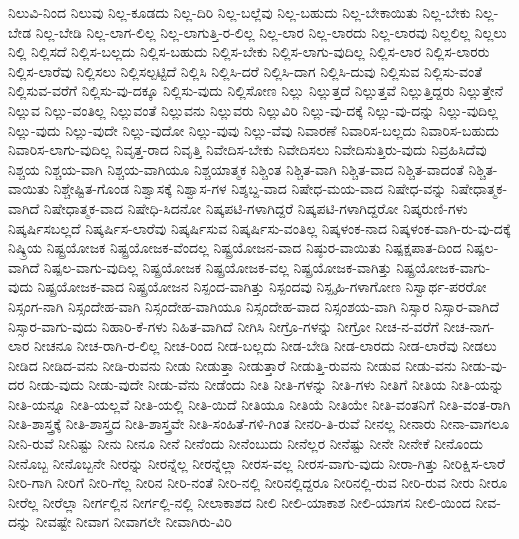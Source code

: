 {ನಿಲುವಿ-ನಿಂದ
ನಿಲುವು
ನಿಲ್ಲ-ಕೂಡದು
ನಿಲ್ಲ-ದಿರಿ
ನಿಲ್ಲ-ಬಲ್ಲೆವು
ನಿಲ್ಲ-ಬಹುದು
ನಿಲ್ಲ-ಬೇಕಾಯಿತು
ನಿಲ್ಲ-ಬೇಕು
ನಿಲ್ಲ-ಬೇಡ
ನಿಲ್ಲ-ಬೇಡಿ
ನಿಲ್ಲ-ಲಾಗ-ಲಿಲ್ಲ
ನಿಲ್ಲ-ಲಾಗುತ್ತಿ-ರ-ಲಿಲ್ಲ
ನಿಲ್ಲ-ಲಾರ
ನಿಲ್ಲ-ಲಾರದು
ನಿಲ್ಲ-ಲಾರವು
ನಿಲ್ಲಲಿಲ್ಲ
ನಿಲ್ಲಲು
ನಿಲ್ಲಿ
ನಿಲ್ಲಿಸದೆ
ನಿಲ್ಲಿಸ-ಬಲ್ಲದು
ನಿಲ್ಲಿಸ-ಬಹುದು
ನಿಲ್ಲಿಸ-ಬೇಕು
ನಿಲ್ಲಿಸ-ಲಾಗು-ವುದಿಲ್ಲ
ನಿಲ್ಲಿಸ-ಲಾರ
ನಿಲ್ಲಿಸ-ಲಾರರು
ನಿಲ್ಲಿಸ-ಲಾರೆವು
ನಿಲ್ಲಿಸಲು
ನಿಲ್ಲಿಸಲ್ಪಟ್ಟಿದೆ
ನಿಲ್ಲಿಸಿ
ನಿಲ್ಲಿಸಿ-ದರೆ
ನಿಲ್ಲಿಸಿ-ದಾಗ
ನಿಲ್ಲಿಸಿ-ದುವು
ನಿಲ್ಲಿಸುವ
ನಿಲ್ಲಿಸು-ವಂತೆ
ನಿಲ್ಲಿಸುವ-ವರೆಗೆ
ನಿಲ್ಲಿಸು-ವು-ದಕ್ಕೂ
ನಿಲ್ಲಿಸು-ವುದು
ನಿಲ್ಲಿಸೋಣ
ನಿಲ್ಲು
ನಿಲ್ಲುತ್ತದೆ
ನಿಲ್ಲುತ್ತವೆ
ನಿಲ್ಲುತ್ತಿದ್ದರು
ನಿಲ್ಲುತ್ತೇನೆ
ನಿಲ್ಲುವ
ನಿಲ್ಲು-ವಂತಿಲ್ಲ
ನಿಲ್ಲುವಂತೆ
ನಿಲ್ಲುವನು
ನಿಲ್ಲುವರು
ನಿಲ್ಲುವಿರಿ
ನಿಲ್ಲು-ವು-ದಕ್ಕೆ
ನಿಲ್ಲು-ವು-ದನ್ನು
ನಿಲ್ಲು-ವುದಿಲ್ಲ
ನಿಲ್ಲು-ವುದು
ನಿಲ್ಲು-ವುದೇ
ನಿಲ್ಲು-ವುದೋ
ನಿಲ್ಲು-ವುವು
ನಿಲ್ಲು-ವೆವು
ನಿವಾರಣೆ
ನಿವಾರಿಸ-ಬಲ್ಲದು
ನಿವಾರಿಸ-ಬಹುದು
ನಿವಾರಿಸ-ಲಾಗು-ವುದಿಲ್ಲ
ನಿವೃತ್ತ-ರಾದ
ನಿವೃತ್ತಿ
ನಿವೇದಿಸ-ಬೇಕು
ನಿವೇದಿಸಲು
ನಿವೇದಿಸುತ್ತಿರು-ವುದು
ನಿವ್ರಹಿಸಿದೆವು
ನಿಶ್ಚಯ
ನಿಶ್ಚಯ-ವಾಗಿ
ನಿಶ್ಚಯ-ವಾಗಿಯೂ
ನಿಶ್ಚಯಾತ್ಮಕ
ನಿಶ್ಚಿಂತ
ನಿಶ್ಚಿತ-ವಾಗಿ
ನಿಶ್ಚಿತ-ವಾದ
ನಿಶ್ಚಿತ-ವಾದಂತೆ
ನಿಶ್ಚಿತ-ವಾಯಿತು
ನಿಶ್ಚೇಷ್ಟಿತ-ಗೊಂಡ
ನಿಶ್ವಾಸಕ್ಕೆ
ನಿಶ್ವಾಸ-ಗಳ
ನಿಶ್ಶಬ್ದ-ವಾದ
ನಿಷೇಧ-ಮಯ-ವಾದ
ನಿಷೇಧ-ವನ್ನು
ನಿಷೇಧಾತ್ಮಕ-ವಾಗಿದೆ
ನಿಷೇಧಾತ್ಮಕ-ವಾದ
ನಿಷೇಧಿ-ಸಿದನೋ
ನಿಷ್ಕಪಟಿ-ಗಳಾಗಿದ್ದರೆ
ನಿಷ್ಕಪಟಿ-ಗಳಾಗಿದ್ದರೋ
ನಿಷ್ಕರುಣಿ-ಗಳು
ನಿಷ್ಕರ್ಷಿಸಬಲ್ಲದೆ
ನಿಷ್ಕರ್ಷಿಸ-ಲಾರೆವು
ನಿಷ್ಕರ್ಷಿಸುವ
ನಿಷ್ಕರ್ಷಿಸು-ವಂತಿಲ್ಲ
ನಿಷ್ಕಳಂಕ-ನಾದ
ನಿಷ್ಕಳಂಕ-ವಾಗಿ-ರು-ವು-ದಕ್ಕೆ
ನಿಷ್ಕ್ರಿಯ
ನಿಷ್ಟ್ರಯೋಜಕ
ನಿಷ್ಟ್ರಯೋಜಕ-ವೆಂದಲ್ಲ
ನಿಷ್ಟ್ರಯೋಜನ-ವಾದ
ನಿಷ್ಠುರ-ವಾಯಿತು
ನಿಷ್ಪಕ್ಷಪಾತ-ದಿಂದ
ನಿಷ್ಪಲ-ವಾಗಿದೆ
ನಿಷ್ಪಲ-ವಾಗು-ವುದಿಲ್ಲ
ನಿಷ್ಪ್ರಯೋಜಕ
ನಿಷ್ಪ್ರಯೋಜಕ-ವಲ್ಲ
ನಿಷ್ಪ್ರಯೋಜಕ-ವಾಗಿತ್ತು
ನಿಷ್ಪ್ರಯೋಜಕ-ವಾಗು-ವುದು
ನಿಷ್ಪ್ರಯೋಜಕ-ವಾದ
ನಿಷ್ಪ್ರಯೋಜನ
ನಿಸ್ಪಂದ-ವಾಗಿತ್ತು
ನಿಸ್ಪಂದವು
ನಿಸ್ಪೃಹಿ-ಗಳಾಗೋಣ
ನಿಸ್ವಾರ್ಥ-ಪರರೋ
ನಿಸ್ಸಂಗ-ನಾಗಿ
ನಿಸ್ಸಂದೇಹ-ವಾಗಿ
ನಿಸ್ಸಂದೇಹ-ವಾಗಿಯೂ
ನಿಸ್ಸಂದೇಹ-ವಾದ
ನಿಸ್ಸಂಶಯ-ವಾಗಿ
ನಿಸ್ಸಾರ
ನಿಸ್ಸಾರ-ವಾಗಿದೆ
ನಿಸ್ಸಾರ-ವಾಗು-ವುದು
ನಿಹಾರಿ-ಕೆ-ಗಳು
ನಿಹಿತ-ವಾಗಿದೆ
ನೀಗಿಸಿ
ನೀಗ್ರೊ-ಗಳನ್ನು
ನೀಗ್ರೋ
ನೀಚ-ನ-ವರೆಗೆ
ನೀಚ-ನಾಗ-ಲಾರ
ನೀಚನೂ
ನೀಚ-ರಾಗಿ-ರ-ಲಿಲ್ಲ
ನೀಚ-ರಿಂದ
ನೀಡ-ಬಲ್ಲದು
ನೀಡ-ಬೇಡಿ
ನೀಡ-ಲಾರದು
ನೀಡ-ಲಾರೆವು
ನೀಡಲು
ನೀಡಿದ
ನೀಡಿದ-ವನು
ನೀಡಿ-ರುವನು
ನೀಡು
ನೀಡುತ್ತಾ
ನೀಡುತ್ತಾರೆ
ನೀಡುತ್ತಿ-ರುವನು
ನೀಡುವ
ನೀಡು-ವನು
ನೀಡು-ವು-ದರ
ನೀಡು-ವುದು
ನೀಡು-ವುದೇ
ನೀಡು-ವೆನು
ನೀಡೆಂದು
ನೀತಿ
ನೀತಿ-ಗಳನ್ನು
ನೀತಿ-ಗಳು
ನೀತಿಗೆ
ನೀತಿಯ
ನೀತಿ-ಯನ್ನು
ನೀತಿ-ಯನ್ನೂ
ನೀತಿ-ಯಲ್ಲವೆ
ನೀತಿ-ಯಲ್ಲಿ
ನೀತಿ-ಯಿದೆ
ನೀತಿಯೂ
ನೀತಿಯೆ
ನೀತಿಯೇ
ನೀತಿ-ವಂತನಿಗೆ
ನೀತಿ-ವಂತ-ರಾಗಿ
ನೀತಿ-ಶಾಸ್ತ್ರಕ್ಕೆ
ನೀತಿ-ಶಾಸ್ತ್ರದ
ನೀತಿ-ಶಾಸ್ತ್ರವೇ
ನೀತಿ-ಸಂಹಿತೆ-ಗಳಿ-ಗಿಂತ
ನೀನರಿ-ತಿ-ರುವೆ
ನೀನಲ್ಲ
ನೀನಾರು
ನೀನಾ-ವಾಗಲೂ
ನೀನಿ-ರುವೆ
ನೀನಿಷ್ಟು
ನೀನು
ನೀನೂ
ನೀನೆ
ನೀನೆಂದು
ನೀನೆಂಬುದು
ನೀನೆಲ್ಲರ
ನೀನೆಷ್ಟು
ನೀನೇ
ನೀನೇಕೆ
ನೀನೊಂದು
ನೀನೊಬ್ಬ
ನೀನೊಬ್ಬನೇ
ನೀರನ್ನು
ನೀರನ್ನೆಲ್ಲ
ನೀರನ್ನೆಲ್ಲಾ
ನೀರಸ-ವಲ್ಲ
ನೀರಸ-ವಾಗು-ವುದು
ನೀರಾ-ಗಿತ್ತು
ನೀರಿಕ್ಷಿಸ-ಲಾರೆ
ನೀರಿ-ಗಾಗಿ
ನೀರಿಗೆ
ನೀರಿ-ಗೆಲ್ಲ
ನೀರಿನ
ನೀರಿ-ನಂತೆ
ನೀರಿ-ನಲ್ಲಿ
ನೀರಿನಲ್ಲಿದ್ದರೂ
ನೀರಿನಲ್ಲಿ-ರುವ
ನೀರಿ-ರುವ
ನೀರು
ನೀರೂ
ನೀರೆಲ್ಲ
ನೀರೆಲ್ಲಾ
ನೀರ್ಗಲ್ಲಿನ
ನೀರ್ಗಲ್ಲಿ-ನಲ್ಲಿ
ನೀಲಾಕಾಶದ
ನೀಲಿ
ನೀಲಿ-ಯಾಕಾಶ
ನೀಲಿ-ಯಾಗಸ
ನೀಲಿ-ಯಿಂದ
ನೀವ-ದನ್ನು
ನೀವಷ್ಟೇ
ನೀವಾಗ
ನೀವಾಗಲೇ
ನೀವಾಗಿರು-ವಿರಿ
}
